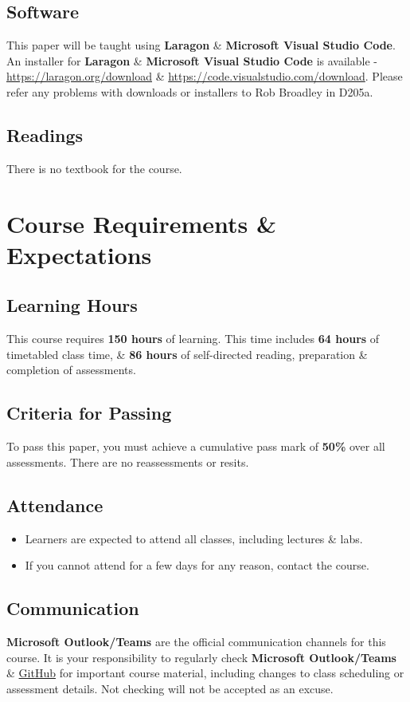 \documentclass{article}
\begin{document}
\subsection*{Software}
This paper will be taught using \textbf{Laragon} \& \textbf{Microsoft Visual Studio Code}. An installer for \textbf{Laragon} \& \textbf{Microsoft Visual Studio Code} is available - \href{https://laragon.org/download/index.html}{https://laragon.org/download} \& \href{https://code.visualstudio.com/download}{https://code.visualstudio.com/download}. Please refer any problems with downloads or installers to Rob Broadley in D205a.

\subsection*{Readings}
There is no textbook for the course.

\section*{Course Requirements \& Expectations}

\subsection*{Learning Hours}
This course requires \textbf{150 hours} of learning. This time includes \textbf{64 hours} of timetabled class time, \& \textbf{86 hours} of self-directed reading, preparation \& completion of assessments.

\subsection*{Criteria for Passing}
To pass this paper, you must achieve a cumulative pass mark of \textbf{50\%} over all assessments. There are no reassessments or resits.

\subsection*{Attendance}
\begin{itemize}
	\item Learners are expected to attend all classes, including lectures \& labs.
	\item If you cannot attend for a few days for any reason, contact the course.
\end{itemize}

\subsection*{Communication}
\textbf{Microsoft Outlook/Teams} are the official communication channels for this course. It is your responsibility to regularly check \textbf{Microsoft Outlook/Teams} \& \href{https://github.com/otago-polytechnic-bit-courses/IN607-intro-app-dev-concepts}{GitHub} for important course material, including changes to class scheduling or assessment details. Not checking will not be accepted as an excuse.
\end{document}
